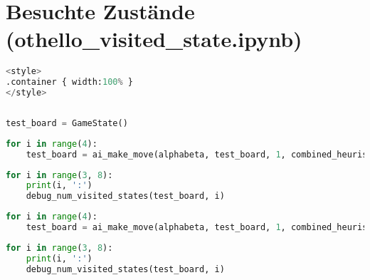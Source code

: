 \hypertarget{besuchte-zustuxe4nde-othello_visited_state.ipynb}{%
\section{Besuchte Zustände
(othello\_visited\_state.ipynb)}\label{besuchte-zustuxe4nde-othello_visited_state.ipynb}}

\label{sec:visitedstates}

\begin{lstlisting}[language=Python]
%%HTML
<style>
.container { width:100% }
</style>
\end{lstlisting}

\begin{lstlisting}[language=Python]
%run othello_test_util.ipynb
\end{lstlisting}

\begin{lstlisting}[language=Python]
test_board = GameState()
\end{lstlisting}

\begin{lstlisting}[language=Python]
for i in range(4):
    test_board = ai_make_move(alphabeta, test_board, 1, combined_heuristic)
\end{lstlisting}

\begin{lstlisting}[language=Python]
for i in range(3, 8):
    print(i, ':')
    debug_num_visited_states(test_board, i)
\end{lstlisting}

\begin{lstlisting}[language=Python]
for i in range(4):
    test_board = ai_make_move(alphabeta, test_board, 1, combined_heuristic)
\end{lstlisting}

\begin{lstlisting}[language=Python]
for i in range(3, 8):
    print(i, ':')
    debug_num_visited_states(test_board, i)
\end{lstlisting}
